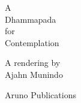 
\thispagestyle{empty}

{\centering

\vspace*{10mm}

\chapterTitleFont\LARGE

A\\
Dhammapada\\
for\\
Contemplation

\vspace*{10mm}

\normalsize

A rendering by\\
Ajahn Munindo

\vfill


Aruno Publications

}

